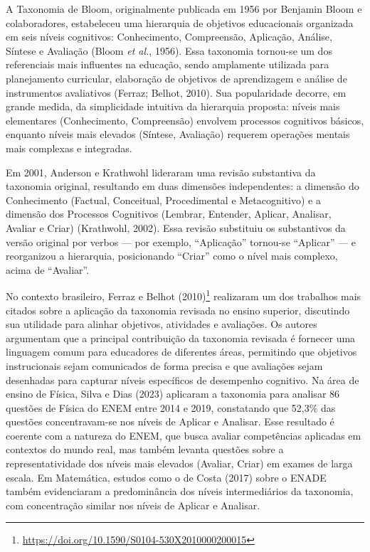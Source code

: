 \documentclass[
  12pt,
  a4paper,
  twoside,
  brazilian
]{article}
\begin{document}
A Taxonomia de Bloom, originalmente publicada em 1956 por Benjamin Bloom
e colaboradores, estabeleceu uma hierarquia de objetivos educacionais
organizada em seis níveis cognitivos: Conhecimento, Compreensão,
Aplicação, Análise, Síntese e Avaliação (Bloom \textit{et al.}, 1956). Essa
taxonomia tornou-se um dos referenciais mais influentes na educação,
sendo amplamente utilizada para planejamento curricular, elaboração de
objetivos de aprendizagem e análise de instrumentos avaliativos (Ferraz;
Belhot, 2010). Sua popularidade decorre, em grande medida, da
simplicidade intuitiva da hierarquia proposta: níveis mais elementares
(Conhecimento, Compreensão) envolvem processos cognitivos básicos,
enquanto níveis mais elevados (Síntese, Avaliação) requerem operações
mentais mais complexas e integradas.

Em 2001, Anderson e Krathwohl lideraram uma revisão substantiva da
taxonomia original, resultando em duas dimensões independentes: a
dimensão do Conhecimento (Factual, Conceitual, Procedimental e
Metacognitivo) e a dimensão dos Processos Cognitivos (Lembrar, Entender,
Aplicar, Analisar, Avaliar e Criar) (Krathwohl, 2002). Essa revisão
substituiu os substantivos da versão original por verbos --- por
exemplo, ``Aplicação'' tornou-se ``Aplicar'' --- e reorganizou a
hierarquia, posicionando ``Criar'' como o nível mais complexo, acima de
``Avaliar''.

No contexto brasileiro, Ferraz e Belhot (2010)\footnote{\url{https://doi.org/10.1590/S0104-530X2010000200015}} realizaram um dos
trabalhos mais citados sobre a aplicação da taxonomia revisada no ensino
superior, discutindo sua utilidade para alinhar objetivos, atividades e
avaliações. Os autores argumentam que a principal contribuição da
taxonomia revisada é fornecer uma linguagem comum para educadores de
diferentes áreas, permitindo que objetivos instrucionais sejam
comunicados de forma precisa e que avaliações sejam desenhadas para
capturar níveis específicos de desempenho cognitivo. Na área de ensino
de Física, Silva e Dias (2023) aplicaram a taxonomia para analisar 86
questões de Física do ENEM entre 2014 e 2019, constatando que 52,3\% das
questões concentravam-se nos níveis de Aplicar e Analisar. Esse
resultado é coerente com a natureza do ENEM, que busca avaliar
competências aplicadas em contextos do mundo real, mas também levanta
questões sobre a representatividade dos níveis mais elevados (Avaliar,
Criar) em exames de larga escala. Em Matemática, estudos como o de Costa
(2017) sobre o ENADE também evidenciaram a predominância dos níveis
intermediários da taxonomia, com concentração similar nos níveis de
Aplicar e Analisar.
\end{document}
